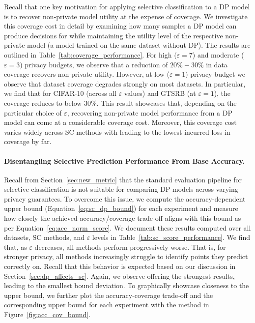 Recall that one key motivation for applying selective classification to a DP model is to recover non-private model utility at the expense of coverage. We investigate this coverage cost in detail by examining how many samples a DP model can produce decisions for while maintaining the utility level of the respective non-private model (\ie a model trained on the same dataset without DP). The results are outlined in Table~\ref{tab:coverage_performance}. For high (\ie $\varepsilon=7$) and moderate (\ie $\varepsilon=3$) privacy budgets, we observe that a reduction of $20\%-30\%$ in data coverage recovers non-private utility. However, at low (\ie $\varepsilon=1$) privacy budget we observe that dataset coverage degrades strongly on most datasets. In particular, we find that for CIFAR-10 (across all $\varepsilon$ values) and GTSRB (at $\varepsilon=1$), the coverage reduces to below $30\%$. This result showcases that, depending on the particular choice of $\varepsilon$, recovering non-private model performance from a DP model can come at a considerable coverage cost. Moreover, this coverage cost varies widely across SC methods with \sctd leading to the lowest incurred loss in coverage by far.

\paragraph{Disentangling Selective Prediction Performance From Base Accuracy.}

Recall from Section~\ref{sec:new_metric} that the standard evaluation pipeline for selective classification is not suitable for comparing DP models across varying privacy guarantees. To overcome this issue, we compute the accuracy-dependent upper bound (Equation~\ref{eq:sc_dp_bound}) for each experiment and measure how closely the achieved accuracy/coverage trade-off aligns with this bound as per Equation~\ref{eq:acc_norm_score}. We document these results computed over all datasets, SC methods, and $\varepsilon$ levels in Table~\ref{tab:sc_score_performance}. We find that, as $\varepsilon$ decreases, all methods perform progressively worse. That is, for stronger privacy, all methods increasingly struggle to identify points they predict correctly on. Recall that this behavior is expected based on our discussion in Section~\ref{sec:dp_affects_sc}. Again, we observe \sctd offering the strongest results, leading to the smallest bound deviation. To graphically showcase closeness to the upper bound, we further plot the accuracy-coverage trade-off and the corresponding upper bound for each experiment with the \sctd method in Figure~\ref{fig:acc_cov_bound}. 

